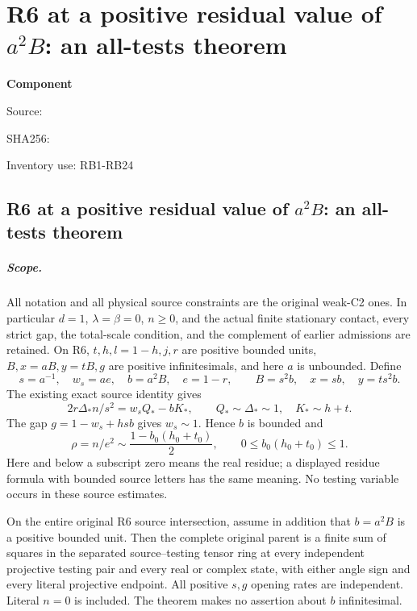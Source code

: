 \chapter{R6 at a positive residual value of $a^2B$: an all-tests theorem}
\label{component:pb60eba754641}
\noindent\textbf{Component }\par
{\small\noindent Source: \par}
{\small\noindent SHA256: \par}
{\small\noindent Inventory use: RB1-RB24\par}
\medskip
\section{R6 at a positive residual value of $a^2B$: an all-tests theorem}
\label{pb60eba754641:sec:r6-b-unit}

\paragraph{Scope.}
All notation and all physical source constraints are the original weak-C2
ones. In particular $d=1$, $\lambda=\beta=0$, $n\geq0$, and the actual
finite stationary contact, every strict gap, the total-scale condition,
and the complement of earlier admissions are retained. On R6,
$t,h,l=1-h,j,r$ are positive bounded units, $B,x=aB,y=tB,g$ are
positive infinitesimals, and here $a$ is unbounded. Define
\[
 s=a^{-1},\quad w_s=ae,\quad b=a^2B,\quad e=1-r,
 \qquad B=s^2b,\quad x=sb,\quad y=ts^2b.
 \tag{RB1}
\]
The existing exact source identity gives
\[
 2r\Delta_*n/s^2=w_sQ_*-bK_*,\qquad
 Q_*\sim\Delta_*\sim1,\quad K_*\sim h+t.
 \tag{RB2}
\]
The gap $g=1-w_s+hsb$ gives $w_s\sim1$. Hence $b$ is bounded and
\[
 \rho=n/e^2\sim\frac{1-b_0(h_0+t_0)}2,\qquad
 0\leq b_0(h_0+t_0)\leq1.                         \tag{RB3}
\]
Here and below a subscript zero means the real residue; a displayed
residue formula with bounded source letters has the same meaning.
No testing variable occurs in these source estimates.

\begin{theorem}
On the entire original R6 source intersection, assume in addition that
$b=a^2B$ is a positive bounded unit. Then the complete original parent
is a finite sum of squares in the separated source--testing tensor ring
at every independent projective testing pair and every real or complex
state, with either angle sign and every literal projective endpoint.
All positive $s,g$ opening rates are independent. Literal $n=0$ is
included. The theorem makes no assertion about $b$ infinitesimal.
\end{theorem}

